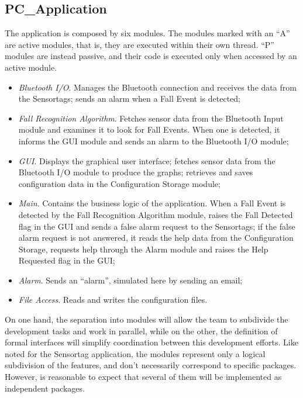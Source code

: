 \documentclass[conference,12pt]{IEEETran}
\begin{document}
\subsection{PC\_Application}
The application is composed by six modules. The modules marked with an “A” are active modules, that is, they are executed within their own thread. “P” modules are instead passive, and their code is executed only when accessed by an active module.
\begin{itemize}
	\item \textit{Bluetooth I/O}. Manages the Bluetooth connection and receives the data from the Sensortags; sends an alarm when a Fall Event is detected;
	\item \textit{Fall Recognition Algorithm}. Fetches sensor data from the Bluetooth Input module and examines it to look for Fall Events. When one is detected, it informs the GUI module and sends an alarm to the Bluetooth I/O module; 
	\item \textit{GUI}. Displays the graphical user interface; fetches sensor data from the Bluetooth I/O module to produce the graphs; retrieves and saves configuration data in the Configuration Storage module;
	\item \textit{Main}. Contains the business logic of the application. When a Fall Event is detected by the Fall Recognition Algorithm module, raises the Fall Detected flag in the GUI and sends a false alarm request to the Sensortags; if the false alarm request is not answered, it reads the help data from the Configuration Storage, requests help through the Alarm module and raises the Help Requested flag in the GUI;
	\item \textit{Alarm}. Sends an “alarm”, simulated here by sending an email;
	\item \textit{File Access}. Reads and writes the configuration files.
\end{itemize}
On one hand, the separation into modules will allow the team to subdivide the development tasks and work in parallel, while on the other, the definition of formal interfaces will simplify coordination between this development efforts.
Like noted for the Sensortag application, the modules represent only a logical subdivision of the features, and don’t necessarily correspond to specific packages. However, is reasonable to expect that several of them will be implemented as independent packages. 
\end{document}
